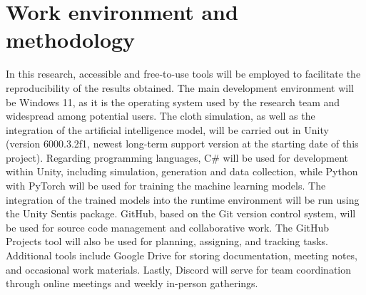 \section*{Work environment and methodology}
In this research, accessible and free-to-use tools will be employed to facilitate the reproducibility of the results obtained. The main development environment will be Windows 11, as it is the operating system used by the research team and widespread among potential users. The cloth simulation, as well as the integration of the artificial intelligence model, will be carried out in Unity (version 6000.3.2f1, newest long-term support version at the starting date of this project). Regarding programming languages, C\# will be used for development within Unity, including simulation, generation and data collection, while Python with PyTorch will be used for training the machine learning models. The integration of the trained models into the runtime environment will be run using the Unity Sentis package. GitHub, based on the Git version control system, will be used for source code management and collaborative work. The GitHub Projects tool will also be used for planning, assigning, and tracking tasks. Additional tools include Google Drive for storing documentation, meeting notes, and occasional work materials. Lastly, Discord will serve for team coordination through online meetings and weekly in-person gatherings.

